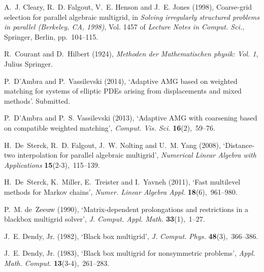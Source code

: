 \documentclass[12pt]{acta_2011xz}
\begin{document}
\begin{thebibliography}{xx}
A.~J. Cleary, R.~D. Falgout, V.~E. Henson and J.~E. Jones  (1998), Coarse-grid
  selection for parallel algebraic multigrid, in {\em Solving irregularly
  structured problems in parallel ({B}erkeley, {CA}, 1998)}, Vol. 1457 of {\em
  Lecture Notes in Comput. Sci.}, Springer, Berlin, pp.~104--115.

R.~Courant and D.~Hilbert  (1924), {\em Methoden der Mathematischen physik:
  Vol. 1}, Julius Springer.

P.~D'Ambra and P.~Vassilevski  (2014), `Adaptive {AMG} based on weighted
  matching for systems of elliptic {PDE}s arising from displacements and mixed
  methods'.
\newblock Submitted.

P.~D'Ambra and P.~S. Vassilevski  (2013), `Adaptive {AMG} with coarsening based
  on compatible weighted matching', {\em Comput. Vis. Sci.} {\bf
  16}(2),~59--76.

H.~De~Sterck, R.~D. Falgout, J.~W. Nolting and U.~M. Yang  (2008),
  `Distance-two interpolation for parallel algebraic multigrid', {\em Numerical
  Linear Algebra with Applications} {\bf 15}(2-3),~115--139.

H.~De~Sterck, K.~Miller, E.~Treister and I.~Yavneh  (2011), `Fast multilevel
  methods for {M}arkov chains', {\em Numer. Linear Algebra Appl.} {\bf
  18}(6),~961--980.

P.~M. de~Zeeuw  (1990), `Matrix-dependent prolongations and restrictions in a
  blackbox multigrid solver', {\em J. Comput. Appl. Math.} {\bf 33}(1),~1--27.

J.~E. Dendy, Jr.  (1982), `Black box multigrid', {\em J. Comput. Phys.} {\bf
  48}(3),~366--386.

J.~E. Dendy, Jr.  (1983), `Black box multigrid for nonsymmetric problems', {\em
  Appl. Math. Comput.} {\bf 13}(3-4),~261--283.


\end{thebibliography}
\end{document}
